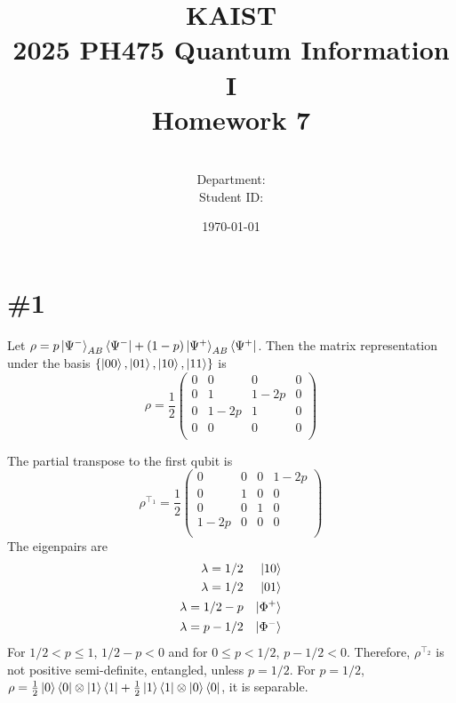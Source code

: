 \documentclass[a4paper,11pt]{article}
\title{KAIST\\2025 PH475 Quantum Information I\\
Homework 7\bigskip}
\author{\textbf{\Large \name} \\
Department: \department\\
Student ID: \studentid}
\date{\today}
\begin{document}
\thispagestyle{empty}
\maketitle
\tableofcontents
{}

\newcommand{\der}[2][]{\frac{d #1}{d #2}}
\newcommand{\pder}[2][]{\frac{\partial #1}{\partial #2}}
\newcommand{\grad}{\operatorname{grad}}
\newcommand{\diver}{\operatorname{div}}
\newcommand{\curl}{\operatorname{curl}}
\newcommand{\tr}{\operatorname{tr}}

\newcommand{\cnot}{C_{\text{NOT}}}
\newcommand{\cz}{C_{Z}}

\section{\#1}

Let $\rho = p\ket{\Psi^-}_{AB}\bra{\Psi^-} + (1-p)\ket{\Psi^+}_{AB}\bra{\Psi^+}$. Then the matrix representation under the basis $\{\ket{00}, \ket{01}, \ket{10}, \ket{11}\}$ is
\begin{equation}
    \rho = \frac{1}{2}\begin{pmatrix}
        0 & 0 & 0 & 0 \\
        0 & 1 & 1-2p & 0 \\
        0 & 1-2p & 1 & 0 \\
        0 & 0 & 0 & 0 \\
    \end{pmatrix}
\end{equation}

The partial transpose to the first qubit is
\begin{equation}
    \rho^{\top_1} = \frac{1}{2}\begin{pmatrix}
        0 & 0 & 0 & 1-2p \\
        0 & 1 & 0 & 0 \\
        0 & 0 & 1 & 0 \\
        1-2p & 0 & 0 & 0 \\
    \end{pmatrix}
\end{equation}
The eigenpairs are
\begin{align}
    \lambda=1/2 & & \ket{10}\\
    \lambda=1/2 & & \ket{01}\\
    \lambda=1/2 - p & & \ket{\Phi^+}\\
    \lambda=p - 1/2 & & \ket{\Phi^-}
\end{align}
For $1/2<p\le 1$, $1/2 - p<0$ and for $0\le p < 1/2$, $p-1/2 < 0$. Therefore, $\rho^{\top_2}$ is not positive semi-definite, entangled, unless $p=1/2$. For $p=1/2$, $\rho=\frac{1}{2}\ket{0}\bra{0}\otimes\ket{1}\bra{1}+\frac{1}{2}\ket{1}\bra{1}\otimes\ket{0}\bra{0}$, it is separable.
\end{document}
